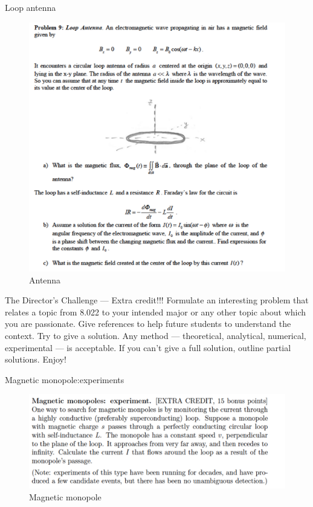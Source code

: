\documentclass[makesolutionspdf]{esg8022pset}
\begin{document}
\begin{problem}{Loop antenna}
\begin{figure}[H]
    \centering
    \includegraphics[width = 15cm]{loopantenna}
    \caption{Antenna}
  \end{figure}
\end{problem}


\begin{problem}{The Director's Challenge --- Extra credit!!!}
  Formulate an interesting problem that relates a topic from 8.022 to your
  intended major or any other topic about which you are passionate.  Give references
  to help future students to understand the context.  Try to give a solution.
  Any method --- theoretical, analytical, numerical, experimental --- is acceptable.
  If you can't give a full solution, outline partial solutions. Enjoy!
\end{problem}


\begin{problem}{Magnetic monopole:experiments}

 \begin{figure}[H]
    \centering
    \includegraphics[width = 15cm]{monopoles}
    \caption{Magnetic monopole}
  \end{figure}

\end{problem}
\end{document}
